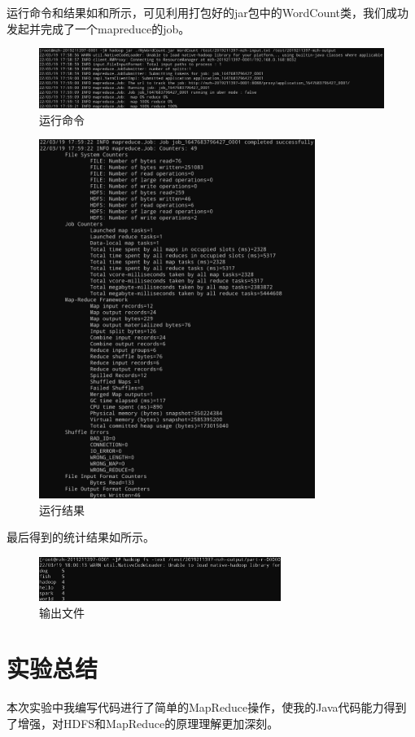 \documentclass[lang=cn,11pt,a4paper,cite=authornum]{paper}
\begin{document}
运行命令和结果如和所示，可见利用打包好的jar包中的WordCount类，我们成功发起并完成了一个mapreduce的job。

\begin{figure}[!htb]
    \centering
    \includegraphics[width=\textwidth]{./images/job.jpg}
    \caption{运行命令\label{fig:job}}
\end{figure}

\begin{figure}[!htb]
    \centering
    \includegraphics[width=0.8\textwidth]{./images/res.jpg}
    \caption{运行结果\label{fig:res}}
\end{figure}

最后得到的统计结果如所示。

\begin{figure}[!htb]
    \centering
    \includegraphics[width=0.7\textwidth]{./images/output.jpg}
    \caption{输出文件\label{fig:output}}
\end{figure}

\section{实验总结}

本次实验中我编写代码进行了简单的MapReduce操作，使我的Java代码能力得到了增强，对HDFS和MapReduce的原理理解更加深刻。
\end{document}
